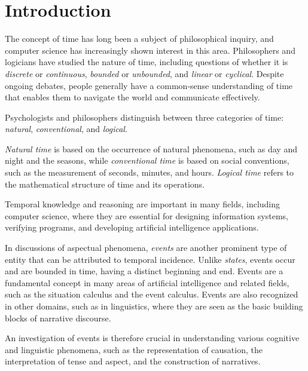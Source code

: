 \chapter{Introduction}
The concept of time has long been a subject of philosophical inquiry, and computer science has increasingly shown interest in this area.
Philosophers and logicians have studied the nature of time, including questions of whether it is \textit{discrete} or \textit{continuous}, \textit{bounded} or \textit{unbounded}, and \textit{linear} or \textit{cyclical}.
Despite ongoing debates, people generally have a common-sense understanding of time that enables them to navigate the world and communicate effectively.

Psychologists and philosophers distinguish between three categories of time: \textit{natural}, \textit{conventional}, and \textit{logical}.

\textit{Natural time} is based on the occurrence of natural phenomena, such as day and night and the seasons, while \textit{conventional time} is based on social conventions, such as the measurement of seconds, minutes, and hours.
\textit{Logical time} refers to the mathematical structure of time and its operations.

Temporal knowledge and reasoning are important in many fields, including computer science, where they are essential for designing information systems, verifying programs, and developing artificial intelligence applications. 

In discussions of aspectual phenomena, \textit{events} are another prominent type of entity that can be attributed to temporal incidence. 
Unlike \textit{states}, events \cite{vendler1957verbs} occur and are bounded in time, having a distinct beginning and end. Events are a fundamental concept in many areas of artificial intelligence and related fields, such as the situation calculus and the event calculus.
Events are also recognized in other domains, such as in linguistics, where they are seen as the basic building blocks of narrative discourse.

An investigation of events is therefore crucial in understanding various cognitive and linguistic phenomena, such as the representation of causation, the interpretation of tense and aspect, and the construction of narratives.


